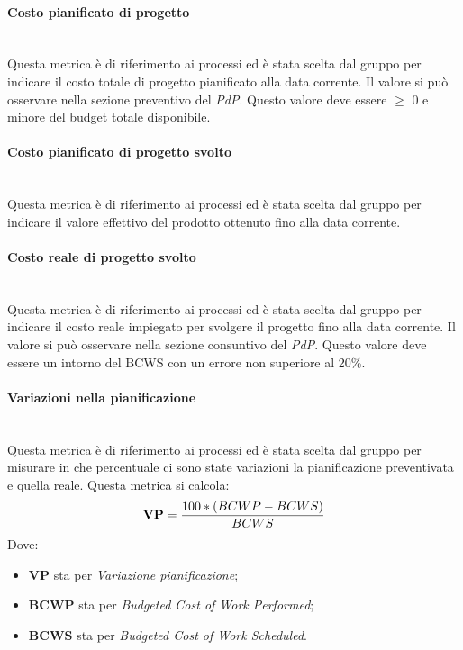 \paragraph{Costo pianificato di progetto}\mbox{}\\
Questa metrica è di riferimento ai processi ed è stata scelta dal gruppo per indicare il costo totale di progetto pianificato alla data corrente. Il valore si può osservare nella sezione preventivo del \textit{PdP}. Questo valore deve essere $\geq$ 0 e minore del budget totale disponibile.
\paragraph{Costo pianificato di progetto svolto}\mbox{}\\
Questa metrica è di riferimento ai processi ed è stata scelta dal gruppo per indicare il valore effettivo del prodotto ottenuto fino alla data corrente.
\paragraph{Costo reale di progetto svolto}\mbox{}\\
Questa metrica è di riferimento ai processi ed è stata scelta dal gruppo per indicare il costo reale impiegato per svolgere il progetto fino alla data corrente. Il valore si può osservare nella sezione consuntivo del \textit{PdP}. Questo valore deve essere un intorno del BCWS con un errore non superiore al 20\%.
\paragraph{Variazioni nella pianificazione}\mbox{}\\
Questa metrica è di riferimento ai processi ed è stata scelta dal gruppo per misurare in che percentuale ci sono state variazioni la pianificazione preventivata e quella reale. Questa metrica si calcola:
\begin{align*}
	\centering
	\textbf{VP} = \frac{100 * (BCWP - BCWS)}{BCWS}
\end{align*}
Dove:
\begin{itemize}
	\item \textbf{VP} sta per \textit{Variazione pianificazione};
	\item \textbf{BCWP} sta per \textit{Budgeted Cost of Work Performed};
	\item \textbf{BCWS} sta per \textit{Budgeted Cost of Work Scheduled}.
\end{itemize}
